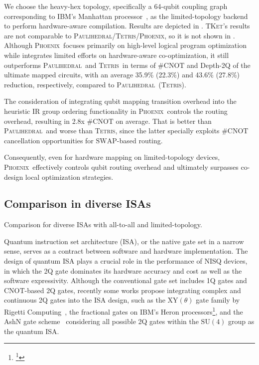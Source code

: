 \documentclass[conference]{IEEEtran}
\newcommand{\phoenix}{\textsc{Phoenix}}
\newcommand{\tket}{\textsc{TKet}}
\newcommand{\tetris}{\textsc{Tetris}}
\newcommand{\paulihedral}{\textsc{Paulihedral}}
\newcommand{\SWAP}{\mathrm{SWAP}}
\newcommand{\CNOT}{\mathrm{CNOT}}
\newcommand{\SUfour}{\mathrm{SU}(4)}
\begin{document}
    We choose the heavy-hex topology, specifically a 64-qubit coupling graph corresponding to IBM's Manhattan processor~\cite{mooney2021whole}, as the limited-topology backend to perform hardware-aware compilation. Results are depicted in . \tket's results are not comparable to \paulihedral/\tetris/\phoenix, so it is not shown in . Although \phoenix\ focuses primarily on high-level logical program optimization while integrates limited efforts on hardware-aware co-optimization, it still outperforms \paulihedral\ and \tetris\ in terms of \#$ \CNOT $ and Depth-2Q of the ultimate mapped circuits, with an average 35.9\% (22.3\%) and 43.6\% (27.8\%) reduction, respectively, compared to \paulihedral\ (\tetris). 
  
    The consideration of integrating qubit mapping transition overhead into the heuristic IR group ordering functionality in \phoenix\ controls the routing overhead, resulting in 2.8x \#$ \CNOT $ on average. That is better than \paulihedral\ and worse than \tetris, since the latter specially exploits \#$\CNOT$ cancellation opportunities for $ \SWAP $-based routing. 

    
    Consequently, even for hardware mapping on limited-topology devices, \phoenix\ effectively controls qubit routing overhead and ultimately surpasses co-design local optimization strategies.


\subsection{Comparison in diverse ISAs}


    \begin{table}[tbp]
        \centering
        \caption{Comparison for diverse ISAs with all-to-all and limited-topology.}
        
        \label{tab:isa}
    \end{table}

    Quantum instruction set architecture (ISA), or the native gate set in a narrow sense, serves as a contract between software and hardware implementation. The design of quantum ISA plays a crucial role in the performance of NISQ devices, in which the 2Q gate dominates its hardware accuracy and cost as well as the software expressivity. Although the conventional gate set includes 1Q gates and CNOT-based 2Q gates, recently some works propose integrating complex and continuous 2Q gates into the ISA design, such as the $\mathrm{XY}(\theta)$ gate family by Rigetti Computing~\cite{abrams2020implementation}, the fractional gates on IBM's Heron processors\footnote{\footnote{\href{https://www.ibm.com/quantum/blog/fractional-gates}{https://www.ibm.com/quantum/blog/fractional-gates}}}, and the AshN gate scheme~\cite{chen2024one} considering all possible 2Q gates within the $\SUfour$ group as the quantum ISA.    
    
\end{document}

